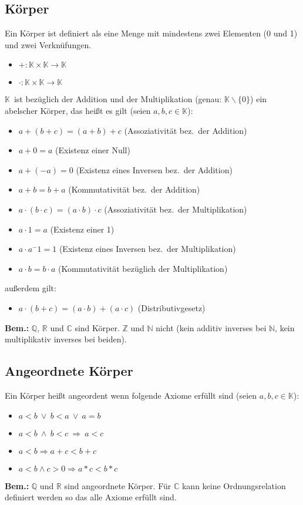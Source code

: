 \documentclass[12pt]{article}
\newcommand{\Korp}{$\mathbb{K}$}
\begin{document}
    \subsection{Körper}
    Ein Körper ist definiert als eine Menge mit mindestens zwei Elementen
    (0 und 1) und zwei Verknüfungen.
    \begin{itemize}
        \item $+: \mathbb{K} \times \mathbb{K} \rightarrow \mathbb{K}$
        \item $\cdot: \mathbb{K} \times \mathbb{K} \rightarrow \mathbb{K}$
    \end{itemize}
    \Korp\ ist bezüglich der Addition und der Multiplikation (genau: $\mathbb{K} \backslash \{0\}$) ein abelscher
    Körper, das heißt es gilt (seien $a,b,c \in \mathbb{K}$):
    \begin{itemize}
        \item $a + (b + c) = (a + b) + c$ (Assoziativität bez.\ der Addition)
        \item $a + 0 = a$ (Existenz einer Null)
        \item $a + (-a) = 0$ (Existenz eines Inversen bez.\ der Addition)
        \item $a + b = b + a$ (Kommutativität bez.\ der Addition)
        \item $a \cdot (b \cdot c) = (a \cdot b) \cdot c$ (Assoziativität bez.\ der Multiplikation)
        \item $a \cdot 1 = a$ (Existenz einer 1)
        \item $a \cdot a^-1 = 1$ (Existenz eines Inversen bez.\ der Multiplikation)
        \item $a \cdot b = b \cdot a$ (Kommutativität bezüglich der Multiplikation)
    \end{itemize}
    außerdem gilt:
    \begin{itemize}
        \item $a \cdot (b + c) = (a \cdot b) + (a \cdot c)$ (Distributivgesetz)
    \end{itemize}
    \textbf{Bem.:}
    $\mathbb{Q}$, $\mathbb{R}$ und $\mathbb{C}$ sind Körper.
    $\mathbb{Z}$ und $\mathbb{N}$ nicht (kein additiv inverses bei $\mathbb{N}$,
    kein multiplikativ inverses bei beiden).


    \subsection{Angeordnete Körper}
    Ein Körper heißt angeordent wenn folgende Axiome erfüllt sind
    (seien $a,b,c \in \mathbb{K}$):
    \begin{itemize}
         \item $a<b\ \vee\ b<a\ \vee\ a=b$
         \item $a<b\ \wedge\ b<c\ \Rightarrow\ a<c$
         \item $a<b \Rightarrow a+c<b+c$
         \item $a<b \wedge c>0 \Rightarrow a*c<b*c$
    \end{itemize}
    \textbf{Bem.:}
    $\mathbb{Q}$ und $\mathbb{R}$ sind angeordnete Körper. Für $\mathbb{C}$
    kann keine Ordnungsrelation definiert werden so das alle Axiome erfüllt
    sind.
\end{document}
